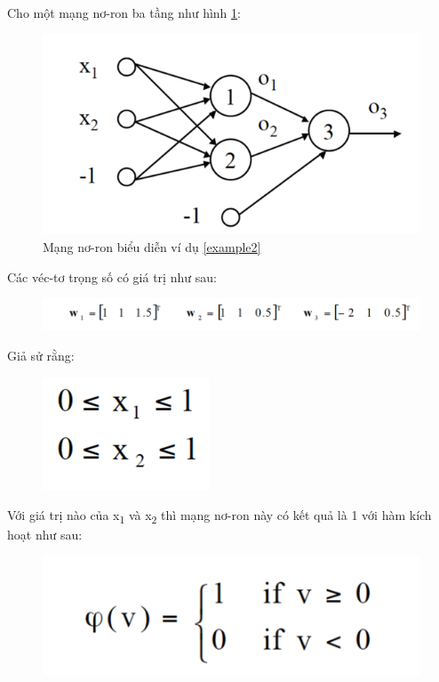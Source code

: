 \begin{exmp}
\label{example2}
\hrulefill\\
Cho một mạng nơ-ron ba tầng như hình \ref{fig:Example2graph}:

\begin{figure}[h]
	\centering
		\includegraphics[width=0.7\columnwidth]{books/artificial-neural-network/chapter01/figure/example 2.png}
		\centering
	\caption{Mạng nơ-ron biểu diễn ví dụ \ref{example2}}
	\label{fig:Example2graph}
\end{figure}

\noindent Các véc-tơ trọng số có giá trị như sau:

\begin{figure}[h]
\includegraphics[width=1\columnwidth]{books/artificial-neural-network/chapter01/figure/example 2-weight .png}
\end{figure}

\noindent Giả sử rằng:

\begin{figure}[!h]
\includegraphics[width=0.2\columnwidth]{books/artificial-neural-network/chapter01/figure/example 2-assume.png}
\end{figure}

\noindent Với giá trị nào của x\textsubscript{1} và x\textsubscript{2} thì mạng nơ-ron này có kết quả là 1 với hàm kích hoạt như sau:
\begin{figure}[!h]
\includegraphics[width=0.4\columnwidth]{books/artificial-neural-network/chapter01/figure/example 2-activation.png}
\end{figure}
\end{exmp}

